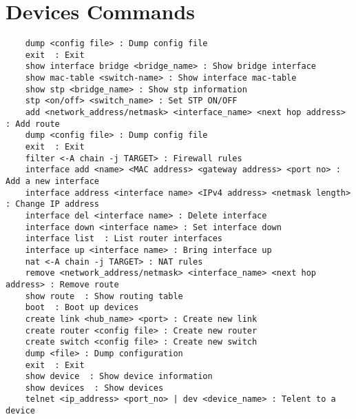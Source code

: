 \chapter{Devices Commands}
\label{chapter:commands}

\lstset{language=TeX,caption=Device commands ,label=lst:dev-commands}
\begin{lstlisting}
	dump <config file> : Dump config file
	exit  : Exit
	show interface bridge <bridge_name> : Show bridge interface
	show mac-table <switch-name> : Show interface mac-table
	show stp <bridge_name> : Show stp information
	stp <on/off> <switch_name> : Set STP ON/OFF
	add <network_address/netmask> <interface_name> <next hop address> : Add route
	dump <config file> : Dump config file
	exit  : Exit
	filter <-A chain -j TARGET> : Firewall rules
	interface add <name> <MAC address> <gateway address> <port no> : Add a new interface
	interface address <interface name> <IPv4 address> <netmask length> : Change IP address
	interface del <interface name> : Delete interface
	interface down <interface name> : Set interface down
	interface list  : List router interfaces
	interface up <interface name> : Bring interface up
	nat <-A chain -j TARGET> : NAT rules
	remove <network_address/netmask> <interface_name> <next hop address> : Remove route
	show route  : Show routing table
	boot  : Boot up devices
	create link <hub_name> <port> : Create new link
	create router <config file> : Create new router
	create switch <config file> : Create new switch
	dump <file> : Dump configuration
	exit  : Exit
	show device  : Show device information
	show devices  : Show devices
	telnet <ip_address> <port_no> | dev <device_name> : Telent to a device
\end{lstlisting}
